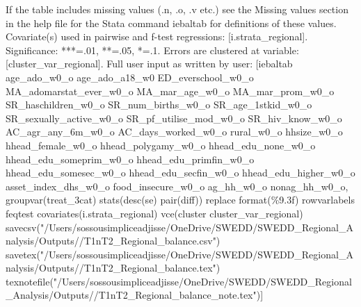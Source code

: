 If the table includes missing values (.n, .o, .v etc.) see the Missing values section in the help file for the Stata command iebaltab for definitions of these values. Covariate(s) used in pairwise and f-test regressions: [i.strata\_regional]. Significance: ***=.01, **=.05, *=.1. Errors are clustered at variable: [cluster\_var\_regional]. Full user input as written by user: [iebaltab age\_ado\_w0\_o age\_ado\_a18\_w0 ED\_everschool\_w0\_o MA\_adomarstat\_ever\_w0\_o MA\_mar\_age\_w0\_o MA\_mar\_prom\_w0\_o SR\_haschildren\_w0\_o SR\_num\_births\_w0\_o SR\_age\_1stkid\_w0\_o SR\_sexually\_active\_w0\_o SR\_pf\_utilise\_mod\_w0\_o SR\_hiv\_know\_w0\_o AC\_agr\_any\_6m\_w0\_o AC\_days\_worked\_w0\_o rural\_w0\_o hhsize\_w0\_o hhead\_female\_w0\_o hhead\_polygamy\_w0\_o hhead\_edu\_none\_w0\_o hhead\_edu\_someprim\_w0\_o hhead\_edu\_primfin\_w0\_o hhead\_edu\_somesec\_w0\_o hhead\_edu\_secfin\_w0\_o hhead\_edu\_higher\_w0\_o asset\_index\_dhs\_w0\_o food\_insecure\_w0\_o ag\_hh\_w0\_o nonag\_hh\_w0\_o, groupvar(treat\_3cat) stats(desc(se) pair(diff)) replace format(\%9.3f) rowvarlabels feqtest covariates(i.strata\_regional) vce(cluster cluster\_var\_regional) savecsv("/Users/sossousimpliceadjisse/OneDrive/SWEDD/SWEDD\_Regional\_Analysis/Outputs//T1nT2\_Regional\_balance.csv") savetex("/Users/sossousimpliceadjisse/OneDrive/SWEDD/SWEDD\_Regional\_Analysis/Outputs//T1nT2\_Regional\_balance.tex") texnotefile("/Users/sossousimpliceadjisse/OneDrive/SWEDD/SWEDD\_Regional\_Analysis/Outputs//T1nT2\_Regional\_balance\_note.tex")] 
